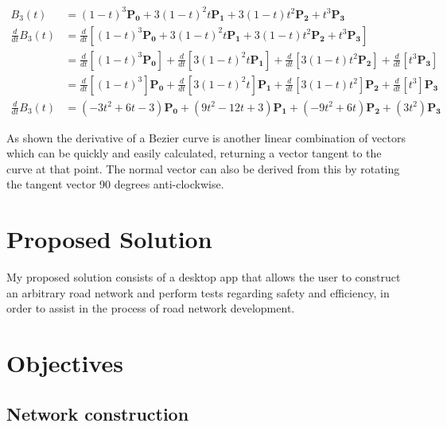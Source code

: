         \begin{align*}
            B_3(t) &= (1 - t)^3\mathbf{P_0} + 3(1 - t)^2t\mathbf{P_1} + 3(1 - t)t^2\mathbf{P_2} + t^3\mathbf{P_3}\\
            \frac{d}{dt}B_3(t) &= \frac{d}{dt}\left[(1 - t)^3\mathbf{P_0} + 3(1 - t)^2t\mathbf{P_1} + 3(1 - t)t^2\mathbf{P_2} + t^3\mathbf{P_3}\right]\\
            &= \frac{d}{dt}\left[(1 - t)^3\mathbf{P_0}\right] + \frac{d}{dt}\left[3(1 - t)^2t\mathbf{P_1}\right] + \frac{d}{dt}\left[3(1 - t)t^2\mathbf{P_2}\right] + \frac{d}{dt}\left[t^3\mathbf{P_3}\right]\\
            &= \frac{d}{dt}\left[(1 - t)^3\right]\mathbf{P_0} + \frac{d}{dt}\left[3(1 - t)^2t\right]\mathbf{P_1} + \frac{d}{dt}\left[3(1 - t)t^2\right]\mathbf{P_2} + \frac{d}{dt}\left[t^3\right]\mathbf{P_3}\\
            \frac{d}{dt}B_3(t) &= (-3t^2 + 6t - 3)\mathbf{P_0} + (9t^2 - 12t + 3)\mathbf{P_1} + (-9t^2 + 6t)\mathbf{P_2} + (3t^2)\mathbf{P_3}
        \end{align*}

        As shown the derivative of a Bezier curve is another linear combination of vectors which can be quickly and easily calculated, returning a vector tangent to the curve at that point. The normal vector can also be derived from this by rotating the tangent vector 90 degrees anti-clockwise.

\section{Proposed Solution}

    My proposed solution consists of a desktop app that allows the user to construct an arbitrary road network and perform tests regarding safety and efficiency, in order to assist in the process of road network development.

\section{Objectives}

    \subsection{Network construction}

